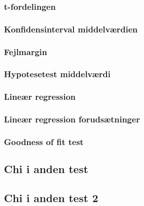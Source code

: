 \documentclass[]{book}
\begin{document}
\hypertarget{t-fordelingen}{%
\subsubsection{t-fordelingen}\label{t-fordelingen}}

\hypertarget{konfidensinterval-middelvrdien}{%
\subsubsection{Konfidensinterval middelværdien}\label{konfidensinterval-middelvrdien}}

\hypertarget{fejlmargin}{%
\subsubsection{Fejlmargin}\label{fejlmargin}}

\hypertarget{hypotesetest-middelvrdi}{%
\subsubsection{Hypotesetest middelværdi}\label{hypotesetest-middelvrdi}}

\hypertarget{liner-regression}{%
\subsubsection{Lineær regression}\label{liner-regression}}

\hypertarget{liner-regression-forudstninger}{%
\subsubsection{Lineær regression forudsætninger}\label{liner-regression-forudstninger}}

\hypertarget{goodness-of-fit-test-1}{%
\subsubsection{Goodness of fit test}\label{goodness-of-fit-test-1}}

\hypertarget{chi-i-anden-test-1}{%
\subsection{Chi i anden test}\label{chi-i-anden-test-1}}

\hypertarget{chi-i-anden-test-2}{%
\subsection{Chi i anden test 2}\label{chi-i-anden-test-2}}
\end{document}
